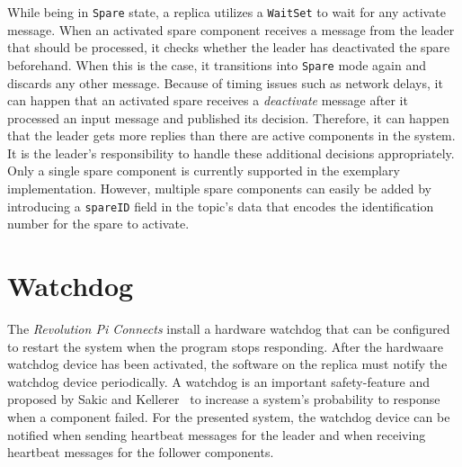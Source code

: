 While being in \texttt{Spare} state, a replica utilizes a \texttt{WaitSet} to wait for any activate message.
When an activated spare component receives a message from the leader that should be processed, it checks whether the leader has deactivated the spare beforehand.
When this is the case, it transitions into \texttt{Spare} mode again and discards any other message.
Because of timing issues such as network delays, it can happen that an activated spare receives a \textit{deactivate} message after it processed an input message and published its decision.
Therefore, it can happen that the leader gets more replies than there are active components in the system.
It is the leader's responsibility to handle these additional decisions appropriately.
\\

Only a single spare component is currently supported in the exemplary implementation.
However, multiple spare components can easily be added by introducing a \texttt{spareID} field in the topic's data that encodes the identification number for the spare to activate.

\section{Watchdog}
The \textit{Revolution Pi Connects} install a hardware watchdog that can be configured to restart the system when the program stops responding.
After the hardwaare watchdog device has been activated, the software on the replica must notify the watchdog device periodically.
A watchdog is an important safety-feature and proposed by Sakic and Kellerer~\cite{SakicTimeInConsensus} to increase a system's probability to response when a component failed.
For the presented system, the watchdog device can be notified when sending heartbeat messages for the leader and when receiving heartbeat messages for the follower components.
